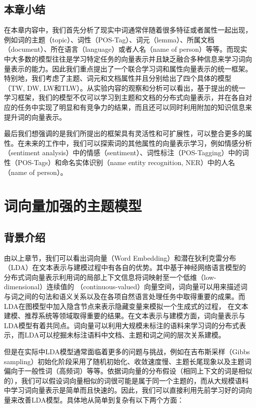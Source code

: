 \documentclass[master]{njuthesis}
\begin{document}
\section{本章小结}\label{sec_conclusions_chap4}

在本章内容中，我们首先分析了现实中词通常伴随着很多特征或者属性一起出现，例如词的主题（topic）、词性（POS-Tag）、词元（lemma）、所属文档（document）、所在语言（language）或者人名（name of person）等等。而现实中大多数的模型往往是学习特定任务的向量表示并且缺乏融合多种信息来学习词向量表示的能力。因此我们重点提出了一个联合学习词和属性向量表示的统一框架。特别地，我们考虑了主题、词元和文档属性并且分别给出了四个具体的模型（TW, DW, LW和TLW）。从实验内容的观察和分析可以看出，基于提出的统一学习框架，我们的模型不仅可以学习到主题和文档的分布式向量表示，并在各自对应的任务中实现了明显和有竞争力的结果，而且还可以同时利用附加的知识信息来提升词的向量表示。

最后我们想强调的是我们所提出的框架具有灵活性和可扩展性，可以整合更多的属性。在未来的工作中，我们可以探索词的其他属性的向量表示学习，例如情感分析（sentiment analysis）中的情感（sentiment）、词性标注（POS-Tagging）中的词性（POS-Tags）和命名实体识别（name entity recognition, NER）中的人名（name of person）。


\chapter{词向量加强的主题模型}\label{chapter5_embedding_topic_model}

\section{背景介绍}\label{sec_bg_chap5}

由以上章节，我们可以看出词向量（Word Embedding）和潜在狄利克雷分布（LDA）在文本表示与建模过程中有各自的优势。其中基于神经网络语言模型的分布式词向量表示利用词的局部上下文信息将词映射至一个低维（low-dimensional）连续值的 （continuous-valued）向量空间，词向量可以用来描述词与词之间的句法和语义关系以及在各项自然语言处理任务中取得重要的成果\cite{mikolov2013efficient,le2014distributed}。而LDA在图模型中加入隐含节点来表示隐藏变量来模拟一个生成式的过程， 在文本建模、推荐系统等领域取得重要的结果\cite{blei2003latent}。在文本表示与建模方面，词向量表示与LDA模型有着共同点。词向量可以利用大规模未标注的语料来学习词的分布式表示，而LDA可以挖掘未标注语料中文档、主题和词之间的层次关系建模。

但是在实际中LDA模型通常面临着更多的问题与挑战，例如在吉布斯采样（Gibbs sampling）初始化阶段采用了随机初始化、收敛速度慢、主题长尾现象以及主题词偏向于一般性词（高频词）等等。依据词向量的分布假设（相同上下文的词是相似的），我们可以假设词向量相似的词很可能是属于同一个主题的，而从大规模语料中学习词向量表示是简单而且快速的。因此，我们可以直接利用先前学习好的词向量来改善LDA模型。具体地从简单到复杂有以下两个方面：
\end{document}
